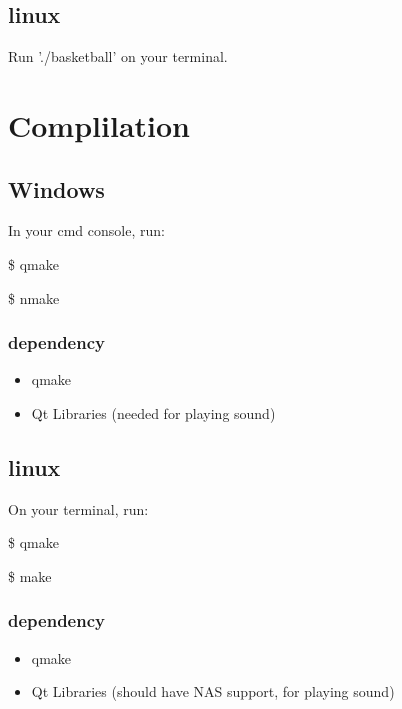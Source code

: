 \documentclass[10pt,a4paper]{article}
\begin{document}
\subsection{linux}
Run './basketball' on your terminal.

\section{Complilation}
\subsection{Windows}
In your cmd console, run:

\$ qmake

\$ nmake
\subsubsection{dependency}
\begin{itemize}
\item qmake
\item Qt Libraries (needed for playing sound)
\end{itemize}
\subsection{linux}
On your terminal, run:

\$ qmake

\$ make
\subsubsection{dependency}
\begin{itemize}
\item qmake
\item Qt Libraries (should have NAS support, for playing sound)
\end{itemize}
\end{document}
